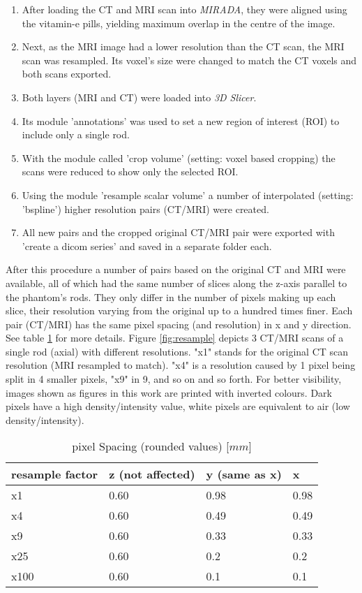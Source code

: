 \begin{enumerate}[label=\textbf{Step \arabic*}]
\item After loading the CT and MRI scan into \textit{MIRADA}, they were aligned using the vitamin-e pills, yielding maximum overlap in the centre of the image.
\item Next, as the MRI image had a lower resolution than the CT scan, the MRI scan was resampled.
Its voxel's size were changed to match the CT voxels and both scans exported.
\item Both layers (MRI and CT) were loaded into \textit{3D Slicer}.
\item Its module 'annotations' was used to set a new region of interest (ROI) to include only a single rod.
\item With the module called 'crop volume' (setting: voxel based cropping) the scans were reduced to show only the selected ROI.
\item Using the module 'resample scalar volume' a number of interpolated (setting: 'bspline') higher resolution pairs (CT/MRI) were created.
\item All new pairs and the cropped original CT/MRI pair were exported with 'create a dicom series' and saved in a separate folder each.
\end{enumerate}
\vspace*{0.5cm}

After this procedure a number of pairs based on the original CT and MRI were available, all of which had the same number of slices along the z-axis parallel to the phantom's rods.
They only differ in the number of pixels making up each slice, their resolution varying from the original up to a hundred times finer.
Each pair (CT/MRI) has the same pixel spacing (and resolution) in x and y direction.
See table \ref{tab:spacing} for more details.
Figure \ref{fig:resample} depicts 3 CT/MRI scans of a single rod (axial) with different resolutions.
"x1" stands for the original CT scan resolution (MRI resampled to match).
"x4" is a resolution caused by 1 pixel being split in 4 smaller pixels, "x9" in 9, and so on and so forth.
For better visibility, images shown as figures in this work are printed with inverted colours.
Dark pixels have a high density/intensity value, white pixels are equivalent to air (low density/intensity).

\begin{table}[!htb]
\centering
\begin{tabular}{l|l|l|l}
resample factor  & z (not affected) &  y (same as x) & x \\
\toprule
x1     & 0.60 & 0.98	& 0.98	\\
x4     & 0.60 & 0.49	& 0.49	\\
x9     & 0.60 & 0.33	& 0.33	\\
x25    & 0.60 & 0.2 	& 0.2	\\
x100   & 0.60 & 0.1 	& 0.1
\end{tabular}
\caption{pixel Spacing (rounded values) [$mm$]}
\label{tab:spacing}
\end{table}

